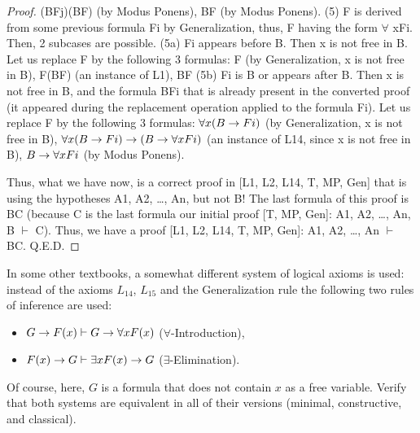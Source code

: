 \begin{proof}
(B\IMPLIES Fj)\IMPLIES (B\IMPLIES F) (by Modus Ponens),
B\IMPLIES F (by Modus Ponens).
(5) F is derived from some previous formula Fi by Generalization, thus, F having the form \(\forall\) xFi. Then, 2
subcases are possible.
(5a) Fi appears before B. Then x is not free in B. Let us replace F by the following 3 formulas:
F (by Generalization, x is not free in B),
F\IMPLIES (B\IMPLIES F) (an instance of L1),
B\IMPLIES F
(5b) Fi is B or appears after B. Then x is not free in B, and the formula B\IMPLIES Fi that is already present in the
converted proof (it appeared during the replacement operation applied to the formula Fi). Let us replace F
by the following 3 formulas:
\(\forall x(B\rightarrow Fi)\) (by Generalization, x is not free in B),
\(\forall x(B\rightarrow Fi)\rightarrow (B\rightarrow \forall xFi)\) (an instance of L14, since x is not free in B),
\(B\rightarrow \forall xFi\) (by Modus Ponens).

Thus, what we have now, is a correct proof in [L1, L2, L14, T, MP, Gen] that is using the hypotheses A1,
A2, \ldots , An, but not B! The last formula of this proof is B\IMPLIES C (because C is the last formula our initial
proof [T, MP, Gen]: A1, A2, \ldots , An, B \(\vdash\) C). Thus, we have a proof [L1, L2, L14, T, MP, Gen]: A1, A2, \ldots ,
An \(\vdash\) B\IMPLIES C. Q.E.D.
\end{proof}

\begin{exercise}
In some other textbooks, a somewhat different system of logical axioms is used: instead of the axioms \(L_{14}\), \(L_{15}\) and the Generalization rule the following two rules of inference are used:
\begin{itemize}
    \item \(G\rightarrow F(x) \vdash G\rightarrow \forall xF(x)\) (\(\forall\)-Introduction),
    \item \(F(x)\rightarrow G \vdash \exists xF(x)\rightarrow G\) (\(\exists\)-Elimination).
\end{itemize}
Of course, here, \(G\) is a formula that does not contain \(x\) as a free variable. Verify that both systems are
equivalent in all of their versions (minimal, constructive, and classical).
\end{exercise}
